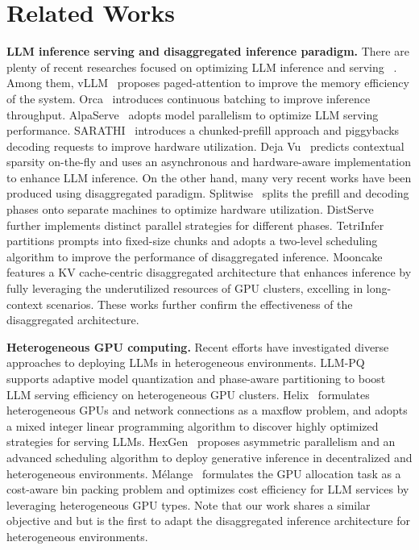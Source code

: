 \section{Related Works}
\textbf{LLM inference serving and disaggregated inference paradigm.} There are plenty of recent researches focused on optimizing LLM inference and serving ~\citep{li2023alpaserve,kwon2023efficient,agrawal2024taming,liu2023deja,wu2023fast,zhou2022pets,yu2022orca}. Among them, 
vLLM~\citep{kwon2023efficient} proposes paged-attention to improve the memory efficiency of the system.
Orca~\citep{yu2022orca} introduces continuous batching to improve inference throughput. 
AlpaServe~\citep{li2023alpaserve} adopts model parallelism to optimize LLM serving performance.
SARATHI~\citep{agrawal2024taming} introduces a chunked-prefill approach and piggybacks decoding requests to improve hardware utilization. 
Deja Vu~\citep{liu2023deja} predicts contextual sparsity on-the-fly and uses an asynchronous and hardware-aware implementation to enhance LLM inference. 
On the other hand, many very recent works have been produced using disaggregated paradigm. 
Splitwise~\citep{patel2024splitwise} splits the prefill and decoding phases onto separate machines to optimize hardware utilization. 
DistServe~\citep{zhong2024distserve} further implements distinct parallel strategies for different phases. TetriInfer~\citep{hu2024inference} partitions prompts into fixed-size chunks and adopts a two-level scheduling algorithm to improve the performance of disaggregated inference. Mooncake~\citep{qin2024mooncake} features a KV cache-centric disaggregated architecture that enhances inference by fully leveraging the underutilized resources of GPU clusters, excelling in long-context scenarios. 
These works further confirm the effectiveness of the disaggregated architecture.




\textbf{Heterogeneous GPU computing.} 
Recent efforts have investigated diverse approaches to deploying LLMs in heterogeneous environments. 
LLM-PQ~\citep{zhao2024llm} supports adaptive model quantization and phase-aware partitioning to boost LLM serving efficiency on heterogeneous GPU clusters. 
Helix~\citep{mei2024helix} formulates heterogeneous GPUs and network connections as a maxflow problem, and adopts a mixed integer linear programming algorithm to discover highly optimized strategies for serving LLMs. HexGen~\citep{jianghexgen} proposes asymmetric parallelism and an advanced scheduling algorithm to deploy generative inference in decentralized and heterogeneous environments. Mélange~\citep{griggs2024m} formulates the GPU allocation task as a cost-aware bin packing problem and optimizes cost efficiency for LLM services by leveraging heterogeneous GPU types. 
Note that our work shares a similar objective and but is the first to adapt the disaggregated inference architecture for heterogeneous environments.


\vspace{-0.5em}